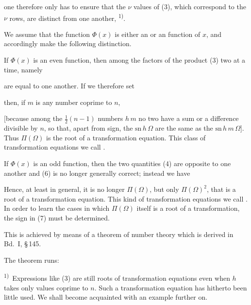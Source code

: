 one therefore only has to ensure that the $\nu$ values of (3), which correspond to the $\nu$ rows, are distinct from one another, \textsuperscript{1)}.

We assume that the function $\Phi(x)$ is either an  or an  function of $x$, and accordingly make the following distinction.

If $\Phi(x)$ is an even function, then among the factors of the product (3) two at a time, namely


are equal to one another. If we therefore set


then, if $m$ is any number coprime to $n$,


[because among the $\frac{1}{2}(n-1)$ numbers $h\,m$ no two have a sum or a difference divisible by $n$, so that, apart from sign, the $\mathrm{sn}\,h\,\Omega$ are the same as the $\mathrm{sn}\,h\,m\,\Omega$]. Thus $\Pi(\Omega)$ is the root of a transformation equation. This class of transformation equations we call .

If $\Phi(x)$ is an odd function, then the two quantities (4) are opposite to one another and (6) is no longer generally correct; instead we have


Hence, at least in general, it is no longer $\Pi(\Omega)$, but only $\Pi(\Omega)^2$, that is a root of a transformation equation. This kind of transformation equations we call . In order to learn the cases in which $\Pi(\Omega)$ itself is a root of a transformation, the sign in (7) must be determined.

This is achieved by means of a theorem of number theory which is derived in Bd.\ I, \S\,145.

The theorem runs:

\textsuperscript{1)}~Expressions like (3) are still roots of transformation equations even when $h$ takes only values coprime to $n$. Such a transformation equation %
has hitherto been little used. We shall become acquainted with an example further on.
